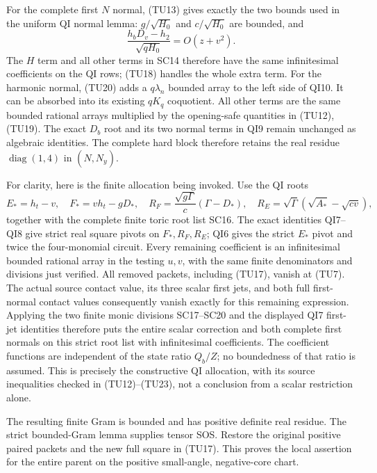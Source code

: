 For the complete first $N$ normal, (TU13) gives exactly the two
bounds used in the uniform QI normal lemma:
$g/\sqrt{H_0}$ and $c/\sqrt{H_0}$ are bounded, and
\[
 \frac{h_bD_v-h_2}{\sqrt{qH_0}}=O(z+v^2).
                                                               \tag{TU23}
\]
The $H$ term and all other terms in SC14 therefore have the same
infinitesimal coefficients on the QI rows; (TU18) handles the whole
extra term.  For the harmonic normal, (TU20) adds a
$q\lambda_n$ bounded array to the left side of QI10.  It can be
absorbed into its existing $qK_q$ coquotient.  All other terms are
the same bounded rational arrays multiplied by the opening-safe
quantities in (TU12), (TU19).  The exact $D_b$ root and its two
normal terms in QI9 remain unchanged as algebraic identities.
The complete hard block therefore retains the real residue
$\operatorname{diag}(1,4)$ in $(\widehat N,N_y)$.

For clarity, here is the finite allocation being invoked.  Use
the QI roots
\[
 E_*=h_t-v,\quad F_*=vh_t-gD_*,\quad
 R_F=\frac{\sqrt{g\Gamma}}c(\Gamma-D_*),\quad
 R_E=\sqrt\Gamma(\sqrt{A_*}-\sqrt{cv}),
\]
together with the complete finite toric root list SC16.
The exact identities QI7--QI8 give strict real square pivots on
$F_*,R_F,R_E$; QI6 gives the strict $E_*$ pivot and twice the
four-monomial circuit.  Every remaining coefficient is an
infinitesimal bounded rational array in the testing $u,v$, with
the same finite denominators and divisions just verified.
All removed packets, including (TU17), vanish at (TU7).
The actual source contact value, its three scalar first jets,
and both full first-normal contact values consequently vanish
exactly for this remaining expression.  Applying the two finite
monic divisions SC17--SC20 and the displayed QI7 first-jet
identities therefore puts the entire scalar correction and
both complete first normals on this strict root list with
infinitesimal coefficients.  The coefficient functions are
independent of the state ratio $Q_b/Z$; no boundedness of that
ratio is assumed.  This is precisely the constructive QI
allocation, with its source inequalities checked in
(TU12)--(TU23), not a conclusion from a scalar restriction alone.

The resulting finite Gram is bounded and has positive definite
real residue.  The strict bounded-Gram lemma supplies tensor SOS.
Restore the original positive paired packets and the new full
square in (TU17).  This proves the local assertion for the entire
parent on the positive small-angle, negative-core chart.

